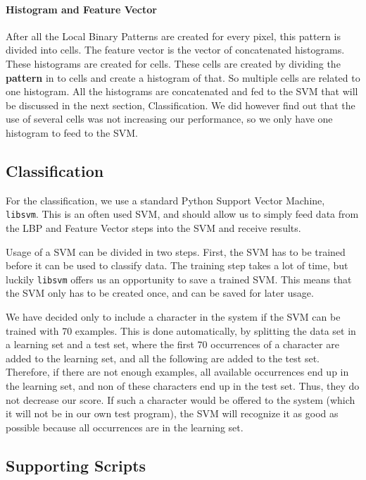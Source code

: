 \documentclass[a4paper]{article}
\begin{document}
\paragraph*{Histogram and Feature Vector}
After all the Local Binary Patterns are created for every pixel, this pattern
is divided into cells. The feature vector is the vector of concatenated
histograms. These histograms are created for cells. These cells are created by
dividing the \textbf{pattern} in to cells and create a histogram of that. So
multiple cells are related to one histogram. All the histograms are
concatenated and fed to the SVM that will be discussed in the next section,
Classification. We did however find out that the use of several cells was not
increasing our performance, so we only have one histogram to feed to the SVM.

\subsection{Classification}

For the classification, we use a standard Python Support Vector Machine,
\texttt{libsvm}. This is an often used SVM, and should allow us to simply feed
data from the LBP and Feature Vector steps into the SVM and receive results.

Usage of a SVM can be divided in two steps. First, the SVM has to be trained
before it can be used to classify data. The training step takes a lot of time,
but luckily \texttt{libsvm} offers us an opportunity to save a trained SVM.
This means that the SVM only has to be created once, and can be saved for later
usage.

We have decided only to include a character in the system if the SVM can be
trained with 70 examples. This is done automatically, by splitting the data set
in a learning set and a test set, where the first 70 occurrences of a character
are added to the learning set, and all the following are added to the test set.
Therefore, if there are not enough examples, all available occurrences end up
in the learning set, and non of these characters end up in the test set. Thus,
they do not decrease our score. If such a character would be offered to the
system (which it will not be in our own test program), the SVM will recognize
it as good as possible because all occurrences are in the learning set.

\subsection{Supporting Scripts}
\end{document}
